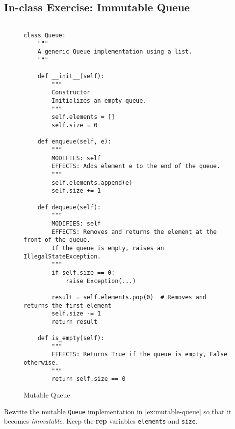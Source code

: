 \documentclass[oneside,11pt,dvipsnames]{book}
\newcommand{\code}[1]{\texttt{#1}}
\begin{document}
\subsection{In-class Exercise: Immutable Queue}\label{ic:immutable-queue}

\begin{figure}
    \begin{lstlisting}

class Queue:
    """
    A generic Queue implementation using a list.
    """

    def __init__(self):
        """
        Constructor
        Initializes an empty queue.
        """
        self.elements = []
        self.size = 0

    def enqueue(self, e):
        """
        MODIFIES: self
        EFFECTS: Adds element e to the end of the queue.
        """
        self.elements.append(e)
        self.size += 1

    def dequeue(self):
        """
        MODIFIES: self
        EFFECTS: Removes and returns the element at the front of the queue.
        If the queue is empty, raises an IllegalStateException.
        """
        if self.size == 0:
            raise Exception(...)

        result = self.elements.pop(0)  # Removes and returns the first element
        self.size -= 1
        return result

    def is_empty(self):
        """
        EFFECTS: Returns True if the queue is empty, False otherwise.
        """
        return self.size == 0

    \end{lstlisting}
    \caption{Mutable Queue}\label{ex:mutable-queue}
\end{figure}

Rewrite the mutable \code{Queue} implementation in \autoref{ex:mutable-queue} so that it becomes \emph{immutable}. Keep the \textbf{rep} variables \code{elements} and \code{size}.





\end{document}
